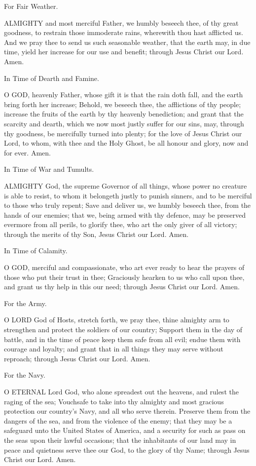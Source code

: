 For Fair Weather.

ALMIGHTY and most merciful Father, we humbly beseech thee, of thy great goodness, to restrain those immoderate rains, wherewith thou hast afflicted us. And we pray thee to send us such seasonable weather, that the earth may, in due time, yield her increase for our use and benefit; through Jesus Christ our Lord. Amen.

In Time of Dearth and Famine.

O GOD, heavenly Father, whose gift it is that the rain doth fall, and the earth bring forth her increase; Behold, we beseech thee, the afflictions of thy people; increase the fruits of the earth by thy heavenly benediction; and grant that the scarcity and dearth, which we now most justly suffer for our sins, may, through thy goodness, be mercifully turned into plenty; for the love of Jesus Christ our Lord, to whom, with thee and the Holy Ghost, be all honour and glory, now and for ever. Amen.

In Time of War and Tumults.

ALMIGHTY God, the supreme Governor of all things, whose power no creature is able to resist, to whom it belongeth justly to punish sinners, and to be merciful to those who truly repent; Save and deliver us, we humbly beseech thee, from the hands of our enemies; that we, being armed with thy defence, may be preserved evermore from all perils, to glorify thee, who art the only giver of all victory; through the merits of thy Son, Jesus Christ our Lord. Amen.

In Time of Calamity.

O GOD, merciful and compassionate, who art ever ready to hear the prayers of those who put their trust in thee; Graciously hearken to us who call upon thee, and grant us thy help in this our need; through Jesus Christ our Lord. Amen.

For the Army.

O LORD God of Hosts, stretch forth, we pray thee, thine almighty arm to strengthen and protect the soldiers of our country; Support them in the day of battle, and in the time of peace keep them safe from all evil; endue them with courage and loyalty; and grant that in all things they may serve without reproach; through Jesus Christ our Lord. Amen.

For the Navy.

O ETERNAL Lord God, who alone spreadest out the heavens, and rulest the raging of the sea; Vouchsafe to take into thy almighty and most gracious protection our country’s Navy, and all who serve therein. Preserve them from the dangers of the sea, and from the violence of the enemy; that they may be a safeguard unto the United States of America, and a security for such as pass on the seas upon their lawful occasions; that the inhabitants of our land may in peace and quietness serve thee our God, to the glory of thy Name; through Jesus Christ our Lord. Amen.
  
